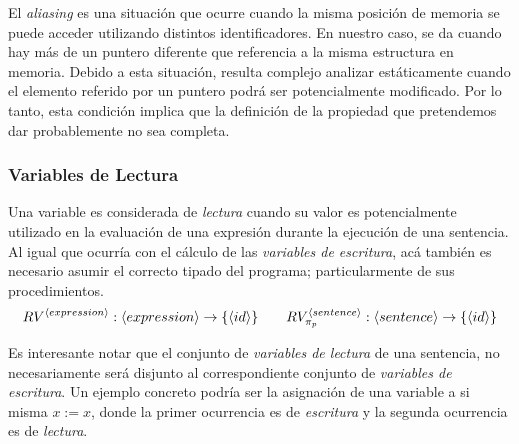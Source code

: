 El \textit{aliasing} es una situación que ocurre cuando la misma posición de memoria se puede acceder utilizando distintos identificadores.
En nuestro caso, se da cuando hay más de un puntero diferente que referencia a la misma estructura en memoria.
Debido a esta situación, resulta complejo analizar estáticamente cuando el elemento referido por un puntero podrá ser potencialmente modificado.
Por lo tanto, esta condición implica que la definición de la propiedad que pretendemos dar probablemente no sea completa.

\subsubsection{Variables de Lectura}

Una variable es considerada de \textit{lectura} cuando su valor es potencialmente utilizado en la evaluación de una expresión durante la ejecución de una sentencia.
Al igual que ocurría con el cálculo de las \textit{variables de escritura}, acá también es necesario asumir el correcto tipado del programa; particularmente de sus procedimientos.
\begin{gather*}
RV^{\langle expression \rangle}: \langle expression \rangle \rightarrow \{ \langle id \rangle \}
\qquad
RV^{\langle sentence \rangle}_{\pi_{p}}: \langle sentence \rangle \rightarrow \{ \langle id \rangle \}
\end{gather*}

Es interesante notar que el conjunto de \textit{variables de lectura} de una sentencia, no necesariamente será disjunto al correspondiente conjunto de \textit{variables de escritura}.
Un ejemplo concreto podría ser la asignación de una variable a si misma $x := x$, donde la primer ocurrencia es de \textit{escritura} y la segunda ocurrencia es de \textit{lectura}.


